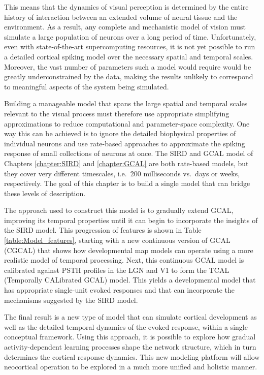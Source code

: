 \documentclass[phd,ianc,twoside]{infthesis}
\begin{document}
This means that the dynamics of visual perception is determined by the
entire history of interaction between an extended volume of neural
tissue and the environment. As a result, any complete and mechanistic
model of vision must simulate a large population of neurons over a long
period of time. Unfortunately, even with state-of-the-art supercomputing
resources, it is not yet possible to run a detailed cortical spiking model
over the necessary spatial and temporal scales.  Moreover, the vast
number of parameters such a model would require would be greatly
underconstrained by the data, making the results unlikely to
correspond to meaningful aspects of the system being simulated.

Building a manageable model that spans the large spatial and temporal
scales relevant to the visual process must therefore use appropriate
simplifying approximations to reduce computational and parameter-space
complexity. One way
this can be achieved is to ignore the detailed biophysical properties of
individual neurons and use rate-based approaches to approximate the
spiking response of small collections of neurons at once. The SIRD and
GCAL model of Chapters \ref{chapter:SIRD} and \ref{chapter:GCAL} are
both rate-based models, but they cover very different timescales,
i.e.\ 200 milliseconds vs.\ days or weeks, respectively.  The goal of
this chapter is to build a single model that can bridge these levels
of description. 

The approach used to construct this model is to gradually extend GCAL,
improving its temporal properties until it can begin to incorporate the
insights of the SIRD model. This progression of features is shown in
Table \ref{table:Model_features}, starting with a new continuous version
of GCAL (\mbox{CGCAL}) that shows how developmental map models can
operate using a more realistic model of temporal processing. Next, this
continuous GCAL model is calibrated against PSTH profiles in the LGN and
V1 to form the TCAL (Temporally CALibrated GCAL) model. This yields a
developmental model that has appropriate single-unit evoked responses
and that can incorporate the mechanisms suggested by the SIRD model.

The final result is a new type of model that can simulate cortical
development as well as the detailed temporal dynamics of the evoked
response, within a single conceptual framework. Using this approach, it
is possible to explore how gradual activity-dependent learning processes
shape the network structure, which in turn determines the cortical
response dynamics. This new modeling platform will allow neocortical
operation to be explored in a much more unified and holistic
manner.
\end{document}

